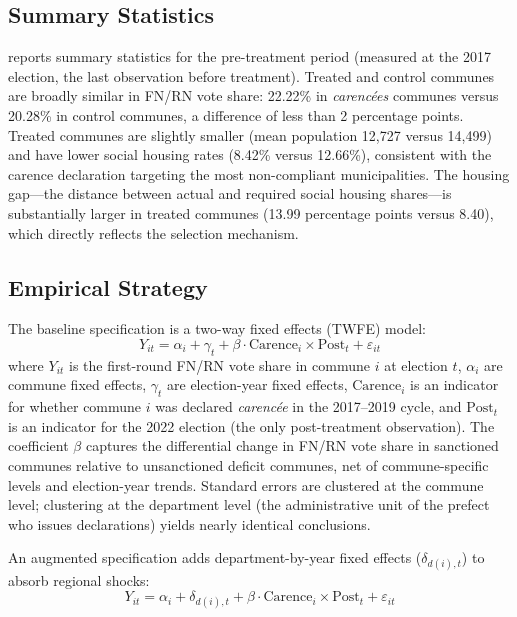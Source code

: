 \documentclass[12pt]{article}
\begin{document}
\subsection{Summary Statistics}

 reports summary statistics for the pre-treatment period (measured at the 2017 election, the last observation before treatment). Treated and control communes are broadly similar in FN/RN vote share: 22.22\% in \textit{caren\-c\'{e}es} communes versus 20.28\% in control communes, a difference of less than 2 percentage points. Treated communes are slightly smaller (mean population 12,727 versus 14,499) and have lower social housing rates (8.42\% versus 12.66\%), consistent with the carence declaration targeting the most non-compliant municipalities. The housing gap---the distance between actual and required social housing shares---is substantially larger in treated communes (13.99 percentage points versus 8.40), which directly reflects the selection mechanism.



\subsection{Empirical Strategy}

The baseline specification is a two-way fixed effects (TWFE) model:
\begin{equation}
\label{eq:twfe}
Y_{it} = \alpha_i + \gamma_t + \beta \cdot \text{Carence}_i \times \text{Post}_t + \varepsilon_{it}
\end{equation}
where $Y_{it}$ is the first-round FN/RN vote share in commune $i$ at election $t$, $\alpha_i$ are commune fixed effects, $\gamma_t$ are election-year fixed effects, $\text{Carence}_i$ is an indicator for whether commune $i$ was declared \textit{caren\-c\'{e}e} in the 2017--2019 cycle, and $\text{Post}_t$ is an indicator for the 2022 election (the only post-treatment observation). The coefficient $\beta$ captures the differential change in FN/RN vote share in sanctioned communes relative to unsanctioned deficit communes, net of commune-specific levels and election-year trends. Standard errors are clustered at the commune level; clustering at the department level (the administrative unit of the prefect who issues declarations) yields nearly identical conclusions.

An augmented specification adds department-by-year fixed effects ($\delta_{d(i),t}$) to absorb regional shocks:
\begin{equation}
\label{eq:twfe_dept}
Y_{it} = \alpha_i + \delta_{d(i),t} + \beta \cdot \text{Carence}_i \times \text{Post}_t + \varepsilon_{it}
\end{equation}
\end{document}
